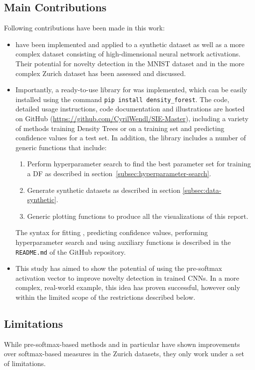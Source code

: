 \documentclass[10pt]{article}
\begin{document}
\subsection{Main Contributions}
\label{subsec:contributions}

Following contributions have been made in this work:
\begin{itemize}
	\item {} have been implemented and applied to a synthetic dataset as well as a more complex dataset consisting of high-dimensional neural network activations. Their potential for novelty detection in the \gls{MNIST} dataset and in the more complex Zurich dataset has been assessed and discussed.
	\item Importantly, a ready-to-use library for  was implemented, which can be easily installed using the command \texttt{pip install density\_forest}. The code, detailed usage instructions, code documentation and illustrations are hosted on GitHub (\url{https://github.com/CyrilWendl/SIE-Master}), including a variety of methods training Density Trees or  on a training set and predicting confidence values for a test set. In addition, the library includes a number of generic functions that include:
	\begin{enumerate}
		\item Perform hyperparameter search to find the best parameter set for training a \acrlong{DF} as described in section \ref{subsec:hyperparameter-search}.
		\item Generate synthetic datasets as described in section \ref{subsec:data-synthetic}.
		\item Generic plotting functions to produce all the visualizations of this report.
	\end{enumerate}
	The syntax for fitting , predicting confidence values, performing hyperparameter search and using auxiliary functions is described in the \texttt{README.md} of the GitHub repository.
	\item This study has aimed to show the potential of using the pre-softmax activation vector to improve novelty detection in trained \glspl{CNN}. In a more complex, real-world example, this idea has proven successful, however only within the limited scope of the restrictions described below.
\end{itemize}

\subsection{Limitations}
While pre-softmax-based methods and  in particular have shown improvements over softmax-based measures in the Zurich datasets, they only work under a set of limitations.
\end{document}
